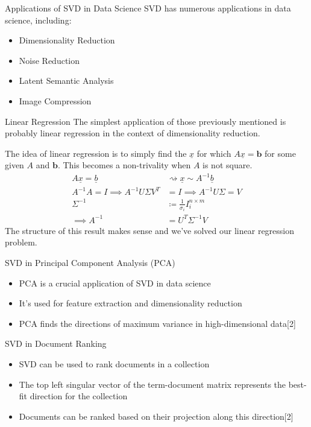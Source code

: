 \documentclass{beamer}
\begin{document}
\begin{frame}{Applications of SVD in Data Science}
    SVD has numerous applications in data science, including:
    \begin{itemize}
        \item Dimensionality Reduction
        \item Noise Reduction
        \item Latent Semantic Analysis
        \item Image Compression
    \end{itemize}
\end{frame}
\begin{frame}{Linear Regression}
The simplest application of those previously mentioned is probably linear regression in the context of dimensionality reduction. \par 
The idea of linear regression is to simply find the $\underline{x}$ for which $A\underline{x} = \mathbf{b}$ for some given $A$ and $\mathbf{b}$. This becomes a non-trivality when $A$ is not square.
\begin{align}
    A \underline{x} = \underline{b} &\rightsquigarrow \underline{x} \sim A^{-1}\underline{b}\\
    A^{-1}A = I \implies A^{-1} U\Sigma V^T &= I \implies A^{-1} U\Sigma = V\\
    \Sigma^{-1} &\coloneqq \frac{1}{\sigma_i}I_i^{n\times m}\\ 
    \implies A^{-1} &= U^T \Sigma^{-1} V
\end{align}
The structure of this result makes sense and we've solved our linear regression problem. 
\end{frame}

\begin{frame}{SVD in Principal Component Analysis (PCA)}
    \begin{itemize}
        \item PCA is a crucial application of SVD in data science
        \item It's used for feature extraction and dimensionality reduction
        \item PCA finds the directions of maximum variance in high-dimensional data[2]
    \end{itemize}
\end{frame}

\begin{frame}{SVD in Document Ranking}
    \begin{itemize}
        \item SVD can be used to rank documents in a collection
        \item The top left singular vector of the term-document matrix represents the best-fit direction for the collection
        \item Documents can be ranked based on their projection along this direction[2]
    \end{itemize}
\end{frame}
\end{document}
